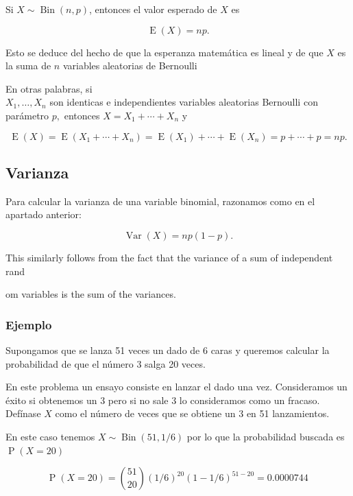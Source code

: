 \documentclass[]{book}
\theoremstyle{plain}
\theoremstyle{definition}
\theoremstyle{definition} %
\begin{document}
Si \(\displaystyle X\sim \operatorname {Bin} (n,p)\), entonces el valor
esperado de \(X\) es

\[\displaystyle \operatorname {E} (X)=np.\]

Esto se deduce del hecho de que la esperanza matemática es lineal y de
que \(X\) es la suma de \(n\) variables aleatorias de Bernoulli

En otras palabras, si\\
\(\displaystyle X_{1},\ldots ,X_{n}\) son identicas e independientes
variables aleatorias Bernoulli con parámetro \(p,\) entonces
\(\displaystyle X=X_{1}+\cdots +X_{n}\) y

\[\displaystyle \operatorname {E} (X)=\operatorname {E} (X_{1}+\cdots +X_{n})=\operatorname {E} (X_{1})+\cdots +\operatorname {E} (X_{n})=p+\cdots +p=np.\]

\hypertarget{varianza-1}{%
\subsection{Varianza}\label{varianza-1}}

Para calcular la varianza de una variable binomial, razonamos como en el
apartado anterior:

\[\displaystyle \operatorname {Var} (X)=np(1-p).\]

This similarly follows from the fact that the variance of a sum of
independent rand

om variables is the sum of the variances.

\hypertarget{ejemplo-1}{%
\subsubsection{Ejemplo}\label{ejemplo-1}}

Supongamos que se lanza 51 veces un dado de 6 caras y queremos calcular
la probabilidad de que el número 3 salga 20 veces.

En este problema un ensayo consiste en lanzar el dado una vez.
Consideramos un éxito si obtenemos un 3 pero si no sale 3 lo
consideramos como un fracaso. Defínase \(X\) como el número de veces que
se obtiene un 3 en 51 lanzamientos.

En este caso tenemos
\(\displaystyle X\sim \operatorname {Bin} (51,1/6)\) por lo que la
probabilidad buscada es \(\displaystyle \operatorname {P} (X=20)\)

\[\displaystyle \operatorname {P} (X=20)={51 \choose 20}(1/6)^{20}(1-1/6)^{51-20}=0.0000744\,\!\]
\end{document}
